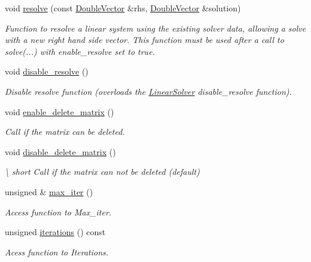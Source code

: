 \begin{DoxyCompactItemize}
void \hyperlink{classoomph_1_1TrilinosAztecOOSolver_a022f537f95c0bf352bab739f2f58bd7f}{resolve} (const \hyperlink{classoomph_1_1DoubleVector}{Double\+Vector} \&rhs, \hyperlink{classoomph_1_1DoubleVector}{Double\+Vector} \&solution)
\begin{DoxyCompactList}\small\item\em Function to resolve a linear system using the existing solver data, allowing a solve with a new right hand side vector. This function must be used after a call to solve(...) with enable\+\_\+resolve set to true. \end{DoxyCompactList}\item 
void \hyperlink{classoomph_1_1TrilinosAztecOOSolver_a7d9c9d9beddb2d18abea55529db534e4}{disable\+\_\+resolve} ()
\begin{DoxyCompactList}\small\item\em Disable resolve function (overloads the \hyperlink{classoomph_1_1LinearSolver}{Linear\+Solver} disable\+\_\+resolve function). \end{DoxyCompactList}\item 
void \hyperlink{classoomph_1_1TrilinosAztecOOSolver_ad48df1a369de8dabe6c2cdb00e05ff87}{enable\+\_\+delete\+\_\+matrix} ()
\begin{DoxyCompactList}\small\item\em Call if the matrix can be deleted. \end{DoxyCompactList}\item 
void \hyperlink{classoomph_1_1TrilinosAztecOOSolver_a6df71e8dd3967f17d39142696f71aef6}{disable\+\_\+delete\+\_\+matrix} ()
\begin{DoxyCompactList}\small\item\em \textbackslash{} short Call if the matrix can not be deleted (default) \end{DoxyCompactList}\item 
unsigned \& \hyperlink{classoomph_1_1TrilinosAztecOOSolver_a5e98e3624970a772e8ddbbcb6c92c24f}{max\+\_\+iter} ()
\begin{DoxyCompactList}\small\item\em Access function to Max\+\_\+iter. \end{DoxyCompactList}\item 
unsigned \hyperlink{classoomph_1_1TrilinosAztecOOSolver_aaa90619b05f448d7bd610f474a9f750d}{iterations} () const
\begin{DoxyCompactList}\small\item\em Acess function to Iterations. \end{DoxyCompactList}\item 

\end{DoxyCompactItemize}
